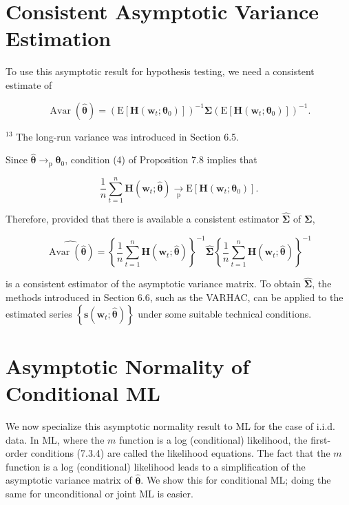 \documentclass[10pt]{article}
\begin{document}
\section*{Consistent Asymptotic Variance Estimation}
To use this asymptotic result for hypothesis testing, we need a consistent estimate of

$$
\operatorname{Avar}(\hat{\boldsymbol{\theta}})=\left(\mathrm{E}\left[\mathbf{H}\left(\mathbf{w}_{t} ; \boldsymbol{\theta}_{0}\right)\right]\right)^{-1} \boldsymbol{\Sigma}\left(\mathrm{E}\left[\mathbf{H}\left(\mathbf{w}_{t} ; \boldsymbol{\theta}_{0}\right)\right]\right)^{-1} .
$$

${ }^{13}$ The long-run variance was introduced in Section 6.5.

Since $\hat{\boldsymbol{\theta}} \rightarrow_{\mathrm{p}} \boldsymbol{\theta}_{0}$, condition (4) of Proposition 7.8 implies that

$$
\frac{1}{n} \sum_{t=1}^{n} \mathbf{H}\left(\mathbf{w}_{t} ; \hat{\boldsymbol{\theta}}\right) \underset{\mathrm{p}}{\rightarrow} \mathrm{E}\left[\mathbf{H}\left(\mathbf{w}_{t} ; \boldsymbol{\theta}_{0}\right)\right] .
$$

Therefore, provided that there is available a consistent estimator $\widehat{\mathbf{\Sigma}}$ of $\mathbf{\Sigma}$,


\begin{equation*}
\widehat{\operatorname{Avar}(\hat{\boldsymbol{\theta}})}=\left\{\frac{1}{n} \sum_{t=1}^{n} \mathbf{H}\left(\mathbf{w}_{t} ; \hat{\boldsymbol{\theta}}\right)\right\}^{-1} \widehat{\boldsymbol{\Sigma}}\left\{\frac{1}{n} \sum_{t=1}^{n} \mathbf{H}\left(\mathbf{w}_{t} ; \hat{\boldsymbol{\theta}}\right)\right\}^{-1} \tag{7.3.11}
\end{equation*}


is a consistent estimator of the asymptotic variance matrix. To obtain $\widehat{\mathbf{\Sigma}}$, the methods introduced in Section 6.6, such as the VARHAC, can be applied to the estimated series $\left\{\mathbf{s}\left(\mathbf{w}_{t} ; \hat{\boldsymbol{\theta}}\right)\right\}$ under some suitable technical conditions.

\section*{Asymptotic Normality of Conditional ML}
We now specialize this asymptotic normality result to ML for the case of i.i.d. data. In ML, where the $m$ function is a log (conditional) likelihood, the first-order conditions (7.3.4) are called the likelihood equations. The fact that the $m$ function is a log (conditional) likelihood leads to a simplification of the asymptotic variance matrix of $\hat{\boldsymbol{\theta}}$. We show this for conditional ML; doing the same for unconditional or joint ML is easier.
\end{document}
